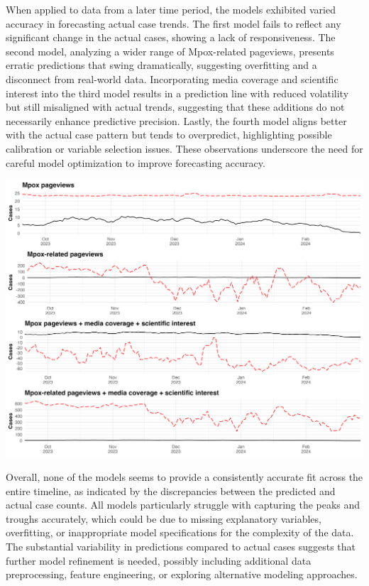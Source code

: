 \documentclass[
  12pt,
]{article}
\begin{document}
When applied to data from a later time period, the models exhibited
varied accuracy in forecasting actual case trends. The first model fails
to reflect any significant change in the actual cases, showing a lack of
responsiveness. The second model, analyzing a wider range of
Mpox-related pageviews, presents erratic predictions that swing
dramatically, suggesting overfitting and a disconnect from real-world
data. Incorporating media coverage and scientific interest into the
third model results in a prediction line with reduced volatility but
still misaligned with actual trends, suggesting that these additions do
not necessarily enhance predictive precision. Lastly, the fourth model
aligns better with the actual case pattern but tends to overpredict,
highlighting possible calibration or variable selection issues. These
observations underscore the need for careful model optimization to
improve forecasting accuracy.

\includegraphics{images/regression-analysis-model-fit-test.png}

Overall, none of the models seems to provide a consistently accurate fit
across the entire timeline, as indicated by the discrepancies between
the predicted and actual case counts. All models particularly struggle
with capturing the peaks and troughs accurately, which could be due to
missing explanatory variables, overfitting, or inappropriate model
specifications for the complexity of the data. The substantial
variability in predictions compared to actual cases suggests that
further model refinement is needed, possibly including additional data
preprocessing, feature engineering, or exploring alternative modeling
approaches.
\end{document}
